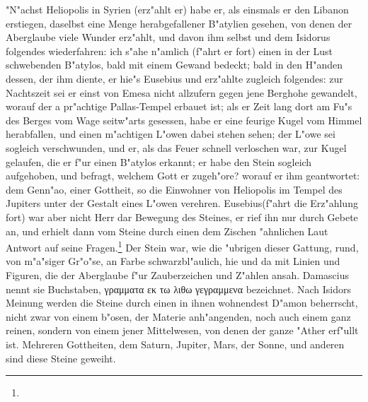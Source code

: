 \documentclass[a4paper, 11pt, oneside, polutonikogreek, german]{article}
\begin{document}
"N"achst Heliopolis in Syrien (erz"ahlt er) habe er, als einsmals er den Libanon erstiegen, daselbst eine Menge herabgefallener B"atylien gesehen, von denen der Aberglaube viele Wunder erz"ahlt, und davon ihm selbst und dem Isidorus folgendes wiederfahren: ich s"ahe n"amlich (f"ahrt er fort) einen in der Lust schwebenden B"atylos, bald mit einem Gewand bedeckt; bald in den H"anden dessen, der ihm diente, er hie"s Eusebius und erz"ahlte zugleich folgendes: zur Nachtszeit sei er einst von Emesa nicht allzufern gegen jene Berghohe gewandelt, worauf der a pr"achtige Pallas-Tempel erbauet ist; als er Zeit lang dort am Fu"s des Berges vom Wage seitw"arts gesessen, habe er eine feurige Kugel vom Himmel herabfallen, und einen m"achtigen L"owen dabei stehen sehen; der L"owe sei sogleich verschwunden, und er, als das Feuer schnell verloschen war, zur Kugel gelaufen, die er f"ur einen B"atylos erkannt; er habe den Stein sogleich aufgehoben, und befragt, welchem Gott er zugeh"ore? worauf er ihm geantwortet: dem Genn"ao, einer Gottheit, so die Einwohner von Heliopolis im Tempel des Jupiters unter der Gestalt eines L"owen verehren. Eusebius(f"ahrt die Erz"ahlung fort) war aber nicht Herr dar Bewegung des Steines, er rief ihn nur durch Gebete an, und erhielt dann vom Steine durch einen dem Zischen "ahnlichen Laut Antwort auf seine Fragen.\footnote{} Der Stein war, wie die "ubrigen dieser Gattung, rund, von m"a"siger Gr"o"se, an Farbe schwarzbl"aulich, hie und da mit Linien und Figuren, die der Aberglaube f"ur Zauberzeichen und Z"ahlen ansah. Damascius nennt sie Buchstaben, γραμματα εκ τω λιθω γεγραμμενα bezeichnet. Nach Isidors Meinung werden die Steine durch einen in ihnen wohnendest D"amon beherrscht, nicht zwar von einem b"osen, der Materie anh"angenden, noch auch einem ganz reinen, sondern von einem jener Mittelwesen, von denen der ganze "Ather erf"ullt ist. Mehreren Gottheiten, dem Saturn, Jupiter, Mars, der Sonne, und anderen sind diese Steine geweiht.
\end{document}
